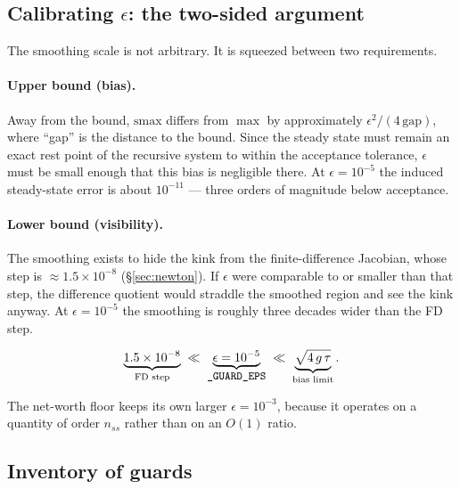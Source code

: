 \documentclass[11pt]{article}
\numberwithin{equation}{section}
\newcommand{\code}[1]{\texttt{\small #1}}
\theoremstyle{definition}
\theoremstyle{plain}
\theoremstyle{remark}
\begin{document}
\subsection{\texorpdfstring{Calibrating $\epsilon$: the two-sided argument}
                          {Calibrating epsilon: the two-sided argument}}

The smoothing scale is not arbitrary. It is squeezed between two requirements.

\paragraph{Upper bound (bias).} Away from the bound, $\mathrm{smax}$ differs from
$\max$ by approximately $\epsilon^{2}/(4\,\text{gap})$, where ``gap'' is the distance
to the bound. Since the steady state must remain an exact rest point of the recursive
system to within the acceptance tolerance, $\epsilon$ must be small enough that this
bias is negligible there. At $\epsilon=10^{-5}$ the induced steady-state error is
about $10^{-11}$ --- three orders of magnitude below acceptance.

\paragraph{Lower bound (visibility).} The smoothing exists to hide the kink from the
finite-difference Jacobian, whose step is $\approx1.5\times10^{-8}$
(\S\ref{sec:newton}). If $\epsilon$ were comparable to or smaller than that step, the
difference quotient would straddle the smoothed region and see the kink anyway. At
$\epsilon=10^{-5}$ the smoothing is roughly three decades wider than the FD step.

\begin{equation}
\underbrace{1.5\times10^{-8}}_{\text{FD step}}\;\ll\;
\underbrace{\epsilon=10^{-5}}_{\code{\_GUARD\_EPS}}\;\ll\;
\underbrace{\sqrt{4\,g\,\tau}}_{\text{bias limit}} .
\label{eq:eps-window}
\end{equation}

The net-worth floor keeps its own larger $\epsilon=10^{-3}$, because it operates on a
quantity of order $n_{ss}$ rather than on an $O(1)$ ratio.

\subsection{Inventory of guards}
\end{document}
